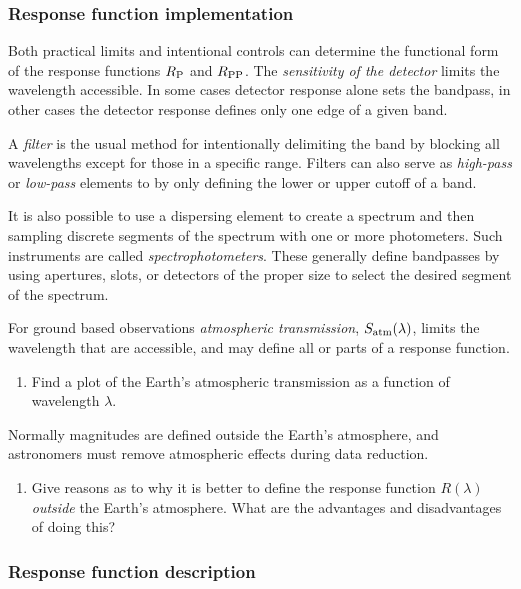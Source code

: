 \subsubsection{Response function implementation} 
Both practical limits and intentional controls can determine the
functional form of the response functions $R_{\rm P}$ and $R_{\rm
  PP}$. The {\it sensitivity of the detector} limits the wavelength
accessible. In some cases detector response alone sets the bandpass, in
other cases the detector response defines only one edge of a given
band. 

A {\it filter} is the usual method for intentionally delimiting the
band by blocking all wavelengths except for those in a specific
range. Filters can also serve as {\it high-pass} or {\it low-pass}
elements to by only defining the lower or upper cutoff of a band.

It is also possible to use a dispersing element to create a spectrum
and then sampling discrete segments of the spectrum with one or more
photometers. Such instruments are called {\it
  spectrophotometers}. These generally define bandpasses by using
apertures, slots, or detectors of the proper size to select the
desired segment of the spectrum. 

For ground based observations {\it atmospheric transmission}, $S_{\rm
  atm}(\lambda)$, limits the wavelength that are accessible, and may
define all or parts of a response function. 

\begin{enumerate}
\setcounter{enumi}{\value{count}}
\item Find a plot of the Earth's atmospheric transmission as a
  function of wavelength $\lambda$.
\setcounter{count}{\value{enumi}} 
\end{enumerate}

Normally magnitudes are defined outside the Earth's atmosphere, and
astronomers must remove atmospheric effects during data reduction.

\begin{enumerate}
\setcounter{enumi}{\value{count}}
\item Give reasons as to why it is better to define the response
  function $R(\lambda)$ {\it outside} the Earth's atmosphere. What are
  the advantages and disadvantages of doing this?
\setcounter{count}{\value{enumi}} 
\end{enumerate}

\subsubsection{Response function description}

